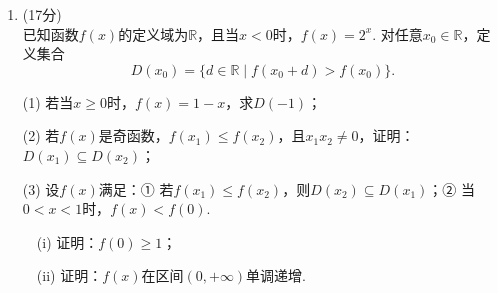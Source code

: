 \documentclass[12pt,a4paper]{article}
\begin{document}
\begin{enumerate}[leftmargin=*,label=\arabic*.,resume,itemsep=1.2ex]
		\item (17分)\\
		已知函数$f(x)$的定义域为$\mathbb{R}$，且当$x<0$时，$f(x)=2^x$. 对任意$x_0\in\mathbb{R}$，定义集合
		\[
		D(x_0)=\{d\in\mathbb{R}\mid f(x_0+d)>f(x_0)\}.
		\]
		
		(1) 若当$x\ge0$时，$f(x)=1-x$，求$D(-1)$；
		
		(2) 若$f(x)$是奇函数，$f(x_1)\le f(x_2)$，且$x_1x_2\ne0$，证明：$D(x_1)\subseteq D(x_2)$；
		
		(3) 设$f(x)$满足：① 若$f(x_1)\le f(x_2)$，则$D(x_2)\subseteq D(x_1)$；② 当$0<x<1$时，$f(x)<f(0)$.
		
		\ \ (i) 证明：$f(0)\ge1$；
		
		\ \ (ii) 证明：$f(x)$在区间$(0,+\infty)$单调递增. 
	\end{enumerate}
	
\end{document}
